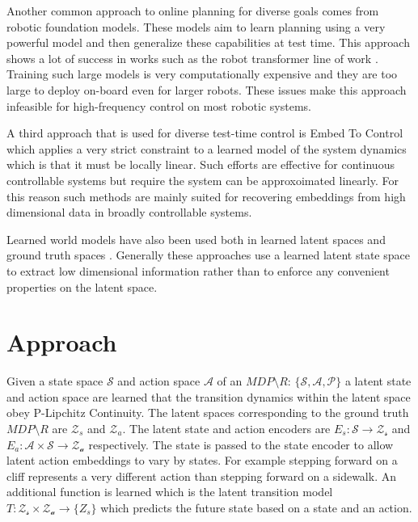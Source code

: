 \documentclass[12pt, twocolumn]{article}
\begin{document}
Another common approach to online planning for diverse goals comes from robotic foundation models.
These models aim to learn planning using a very powerful model and then generalize these capabilities at test time.
This approach shows a lot of success in works such as the robot transformer line of work \cite{brohan_rt-1_2022,brohan_rt-2_2023,padalkar_open_2023}.
Training such large models is very computationally expensive and they are too large to deploy on-board even for larger robots.
These issues make this approach infeasible for high-frequency control on most robotic systems.

A third approach that is used for diverse test-time control is Embed To Control \cite{watter_embed_2015} which applies a very strict constraint to a learned model of the system dynamics which is that it must be locally linear.
Such efforts are effective for continuous controllable systems but require the system can be approxoimated linearly.
For this reason such methods are mainly suited for recovering embeddings from high dimensional data in broadly controllable systems.

Learned world models have also been used both in learned latent spaces \cite{hafner_dream_2020} and ground truth spaces \cite{lowrey_plan_2019}.
Generally these approaches use a learned latent state space to extract low dimensional information rather than to enforce any convenient properties on the latent space.

\section{Approach}

Given a state space \(\mathcal{S}\) and action space \(\mathcal{A}\) of an \(M\!D\!P\setminus\!R\): \(\{\mathcal{S}, \mathcal{A}, \mathcal{P}\}\) a latent state and action space are learned that the transition dynamics within the latent space obey P-Lipchitz Continuity.
The latent spaces corresponding to the ground truth \(M\!D\!P\setminus\!R\) are \(\mathcal{Z}_s\) and \(\mathcal{Z}_a\).
The latent state and action encoders are \(E_s: \mathcal{S} \rightarrow \mathcal{Z_s}\) and \(E_a: \mathcal{A} \times \mathcal{S} \rightarrow \mathcal{Z_a}\) respectively.
The state is passed to the state encoder to allow latent action embeddings to vary by states.
For example stepping forward on a cliff represents a very different action than stepping forward on a sidewalk.
An additional function is learned which is the latent transition model \(T: \mathcal{Z_s} \times \mathcal{Z_a} \rightarrow \{Z_s\}\) which predicts the future state based on a state and an action.
\end{document}
